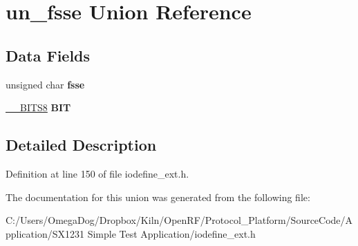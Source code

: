 \hypertarget{unionun__fsse}{\section{un\-\_\-fsse Union Reference}
\label{unionun__fsse}
}
\subsection*{Data Fields}
\begin{DoxyCompactItemize}
\item 
\hypertarget{unionun__fsse_a6aec2cde1a9dc02e9ff92191b8d1f90c}{unsigned char {\bfseries fsse}}\label{unionun__fsse_a6aec2cde1a9dc02e9ff92191b8d1f90c}

\item 
\hypertarget{unionun__fsse_a4134269252d8513767ad16b999599554}{\hyperlink{struct_____b_i_t_s8}{\-\_\-\-\_\-\-B\-I\-T\-S8} {\bfseries B\-I\-T}}\label{unionun__fsse_a4134269252d8513767ad16b999599554}

\end{DoxyCompactItemize}


\subsection{Detailed Description}


Definition at line 150 of file iodefine\-\_\-ext.\-h.



The documentation for this union was generated from the following file\-:\begin{DoxyCompactItemize}
\item 
C\-:/\-Users/\-Omega\-Dog/\-Dropbox/\-Kiln/\-Open\-R\-F/\-Protocol\-\_\-\-Platform/\-Source\-Code/\-Application/\-S\-X1231 Simple Test Application/iodefine\-\_\-ext.\-h\end{DoxyCompactItemize}

